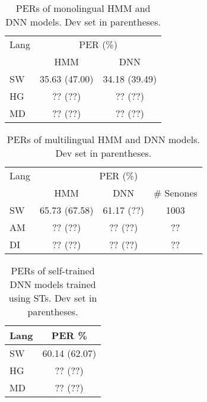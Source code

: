 \documentclass[a4paper]{article}
\begin{document}
\begin{table}
\centering %
\caption{PERs of monolingual HMM and DNN models. Dev set in parentheses.}
\begin{tabular}{l|c c}
   \hline
Lang  & \multicolumn{2}{c}{PER (\%)} \\
          & HMM     & DNN   \\ \hline
SW        & 35.63 (47.00)   & 34.18 (39.49)   \\
HG        & ?? (??)   & ?? (??)   \\ 
MD        & ?? (??)   & ?? (??)  \\ \hline 
\end{tabular}
\vspace{-5mm}
\label{Tab:PER_Matched_Monolingual}
\end{table}

\begin{table}
\centering %
\caption{PERs of multilingual HMM and DNN models. Dev set in parentheses.}
\begin{tabular}{l|c c c}
   \hline
Lang  & \multicolumn{3}{c}{PER (\%)} \\
          &  HMM & DNN & \# Senones   \\ \hline
SW      &65.73 (67.58)   &61.17 (??) & 1003 \\
AM      &?? (??)   &?? (??) &  ?? \\ 
DI     &?? (??)   &?? (??) & ??  \\ \hline
\end{tabular}
\vspace{-7mm}
\label{Tab:PER_Mismatched_Multilingual}
\end{table}

\begin{table}
\centering %
\caption{PERs of self-trained DNN models trained using STs. Dev set in parentheses.}
\begin{tabular}{l|c }
   \hline
Lang  & \multicolumn{1}{c}{PER \%} \\ \hline
SW   &  60.14 (62.07)  \\
HG   &  ?? (??) \\
MD   &  ?? (??)  \\ \hline
\end{tabular}
\vspace{-8mm}
\label{Tab:PER_ASRPT_DNN_monosoftmax}
\end{table}
\end{document}

